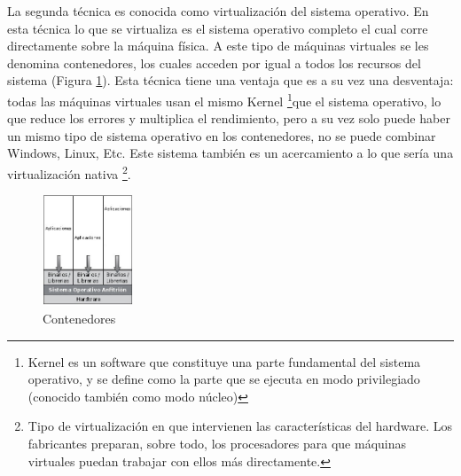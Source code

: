 \documentclass[conference, spanish]{IEEEtran}
\begin{document}
La segunda técnica es conocida como virtualización del sistema operativo. En esta técnica lo que se virtualiza es el sistema operativo completo el cual corre directamente sobre la máquina física. A este tipo de máquinas virtuales se les denomina contenedores, los cuales acceden por igual a todos los recursos del sistema (Figura \ref{fig:contenedores}). Esta técnica tiene una ventaja que es a su vez una desventaja: todas las máquinas virtuales usan el mismo Kernel \footnote{Kernel es un software que constituye una parte fundamental del sistema operativo, y se define como la parte que se ejecuta en modo privilegiado (conocido también como modo núcleo)}que el sistema operativo, lo que reduce los errores y multiplica el rendimiento, pero a su vez solo puede haber un mismo tipo de sistema operativo en los contenedores, no se puede combinar Windows, Linux, Etc. Este sistema también es un acercamiento a lo que sería una virtualización nativa \footnote{Tipo de virtualización en que intervienen las características del hardware. Los fabricantes preparan, sobre todo, los procesadores para que máquinas virtuales puedan trabajar con ellos más directamente.}.\\

\begin{figure}[h]
  \centering
  \includegraphics[width = 0.24\textwidth]{../architecture/v1/diagrams/contenedores}
  \caption{Contenedores}
  \label{fig:contenedores}  
\end{figure}

\end{document}
